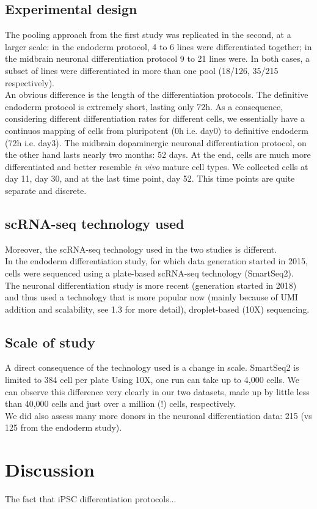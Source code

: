 \subsection{Experimental design}
The pooling approach from the first study was replicated in the second, at a larger scale: in the endoderm protocol, 4 to 6 lines were differentiated together; in the midbrain neuronal differentiation protocol 9 to 21 lines were.
In both cases, a subset of lines were differentiated in more than one pool (18/126, 35/215 respectively).\\

An obvious difference is the length of the differentiation protocols.
The definitive endoderm protocol is extremely short, lasting only 72h.
As a consequence, considering different differentiation rates for different cells, we essentially have a continuos mapping of cells from pluripotent (0h i.e. day0) to definitive endoderm (72h i.e. day3).
The midbrain dopaminergic neuronal differentiation protocol, on the other hand lasts nearly two months: 52 days.
At the end, cells are much more differentiated and better resemble \textit{in vivo }mature cell types.
We collected cells at day 11, day 30, and at the last time point, day 52.
This time points are quite separate and discrete.


\subsection{scRNA-seq technology used}

Moreover, the scRNA-seq technology used in the two studies is different.\\

In the endoderm differentiation study, for which data generation started in 2015, cells were sequenced using a plate-based scRNA-seq technology (SmartSeq2).\\

The neuronal differentiation study is more recent (generation started in 2018) and thus used a technology that is more popular now (mainly because of UMI addition and scalability, see 1.3 for more detail), droplet-based (10X) sequencing.

\subsection{Scale of study}
A direct consequence of the technology used is a change in scale.
SmartSeq2 is limited to 384 cell per plate
Using 10X, one run can take up to 4,000 cells.
We can observe this difference very clearly in our two datasets, made up by little less than 40,000 cells and just over a million (!) cells, respectively.\\

We did also assess many more donors in the neuronal differentiation data: 215 (vs 125 from the endoderm study).

\section{Discussion}

The fact that iPSC differentiation protocols...